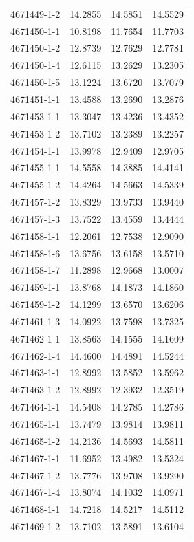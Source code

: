 \begin{longtable}{lrrr}
4671449-1-2 & 14.2855 & 14.5851 & 14.5529 \\
4671450-1-1 & 10.8198 & 11.7654 & 11.7703 \\
4671450-1-2 & 12.8739 & 12.7629 & 12.7781 \\
4671450-1-4 & 12.6115 & 13.2629 & 13.2305 \\
4671450-1-5 & 13.1224 & 13.6720 & 13.7079 \\
4671451-1-1 & 13.4588 & 13.2690 & 13.2876 \\
4671453-1-1 & 13.3047 & 13.4236 & 13.4352 \\
4671453-1-2 & 13.7102 & 13.2389 & 13.2257 \\
4671454-1-1 & 13.9978 & 12.9409 & 12.9705 \\
4671455-1-1 & 14.5558 & 14.3885 & 14.4141 \\
4671455-1-2 & 14.4264 & 14.5663 & 14.5339 \\
4671457-1-2 & 13.8329 & 13.9733 & 13.9440 \\
4671457-1-3 & 13.7522 & 13.4559 & 13.4444 \\
4671458-1-1 & 12.2061 & 12.7538 & 12.9090 \\
4671458-1-6 & 13.6756 & 13.6158 & 13.5710 \\
4671458-1-7 & 11.2898 & 12.9668 & 13.0007 \\
4671459-1-1 & 13.8768 & 14.1873 & 14.1860 \\
4671459-1-2 & 14.1299 & 13.6570 & 13.6206 \\
4671461-1-3 & 14.0922 & 13.7598 & 13.7325 \\
4671462-1-1 & 13.8563 & 14.1555 & 14.1609 \\
4671462-1-4 & 14.4600 & 14.4891 & 14.5244 \\
4671463-1-1 & 12.8992 & 13.5852 & 13.5962 \\
4671463-1-2 & 12.8992 & 12.3932 & 12.3519 \\
4671464-1-1 & 14.5408 & 14.2785 & 14.2786 \\
4671465-1-1 & 13.7479 & 13.9814 & 13.9811 \\
4671465-1-2 & 14.2136 & 14.5693 & 14.5811 \\
4671467-1-1 & 11.6952 & 13.4982 & 13.5324 \\
4671467-1-2 & 13.7776 & 13.9708 & 13.9290 \\
4671467-1-4 & 13.8074 & 14.1032 & 14.0971 \\
4671468-1-1 & 14.7218 & 14.5217 & 14.5112 \\
4671469-1-2 & 13.7102 & 13.5891 & 13.6104 \\

\end{longtable}
